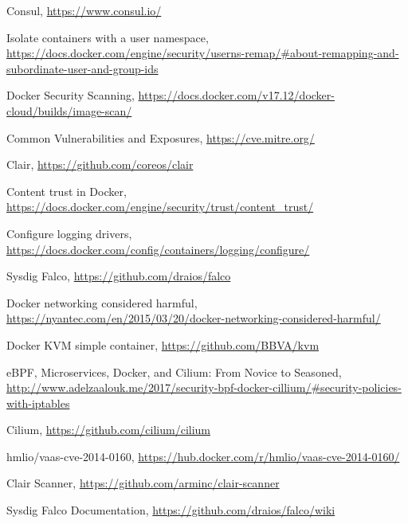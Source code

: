 \documentclass[a4paper,12pt]{article}
\begin{document}
\begin{thebibliography}{99}
Consul, \url{https://www.consul.io/}

Isolate containers with a user namespace,
\url{https://docs.docker.com/engine/security/userns-remap/#about-remapping-and-subordinate-user-and-group-ids}

Docker Security Scanning,
\url{https://docs.docker.com/v17.12/docker-cloud/builds/image-scan/}

Common Vulnerabilities and Exposures, \url{https://cve.mitre.org/}

Clair, \url{https://github.com/coreos/clair} 

Content trust in Docker,
\url{https://docs.docker.com/engine/security/trust/content_trust/}

Configure logging drivers,
\url{https://docs.docker.com/config/containers/logging/configure/}

Sysdig Falco, \url{https://github.com/draios/falco}

Docker networking considered harmful,
\url{https://nyantec.com/en/2015/03/20/docker-networking-considered-harmful/}

Docker KVM simple container, \url{https://github.com/BBVA/kvm}

eBPF, Microservices, Docker, and Cilium: From Novice to Seasoned,
\url{http://www.adelzaalouk.me/2017/security-bpf-docker-cillium/#security-policies-with-iptables}

Cilium, \url{https://github.com/cilium/cilium}

hmlio/vaas-cve-2014-0160, \url{https://hub.docker.com/r/hmlio/vaas-cve-2014-0160/}

Clair Scanner, \url{https://github.com/arminc/clair-scanner}

Sysdig Falco Documentation, \url{https://github.com/draios/falco/wiki}

\end{thebibliography}
\end{document}
